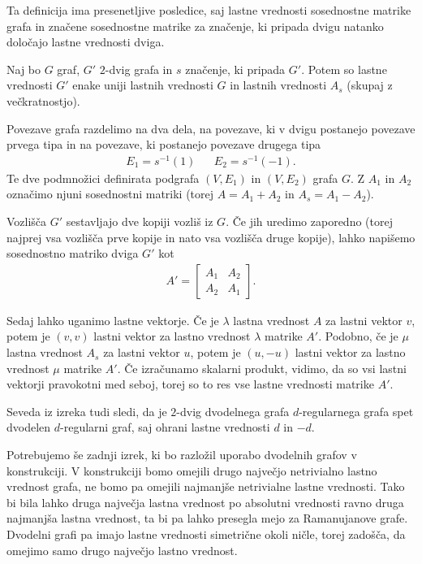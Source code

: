Ta definicija ima presenetljive posledice, saj lastne vrednosti sosednostne matrike grafa in značene sosednostne matrike za značenje, ki pripada dvigu natanko določajo lastne vrednosti dviga\cite{bilu2004constructingexpandergraphs2lifts}.
\begin{izrek}
    Naj bo \(G\) graf, \(G'\) \(2\)-dvig grafa in \(s\) značenje, ki pripada \(G'\). Potem so lastne vrednosti \(G'\) enake uniji lastnih vrednosti \(G\) in lastnih vrednosti \(A_s\) (skupaj z večkratnostjo).
\end{izrek}
\begin{dokaz}
    Povezave grafa razdelimo na dva dela, na povezave, ki v dvigu postanejo povezave prvega tipa in na povezave, ki postanejo povezave drugega tipa
    \begin{align*}
        E_1 = s^{-1}(1) &  & E_2 = s^{-1}(-1).
    \end{align*}
    Te dve podmnožici definirata podgrafa \((V, E_1)\) in \((V, E_2)\) grafa \(G\). Z \(A_1\) in \(A_2\) označimo njuni sosednostni matriki (torej \(A = A_1 + A_2\) in \(A_s = A_1 - A_2\)).

    Vozlišča \(G'\) sestavljajo dve kopiji vozliš iz \(G\). Če jih uredimo zaporedno (torej najprej vsa vozlišča prve kopije in nato vsa vozlišča druge kopije), lahko napišemo sosednostno matriko dviga \(G'\) kot
    \begin{align*}
        A' = \begin{bmatrix}
                 A_1 & A_2 \\
                 A_2 & A_1
             \end{bmatrix}.
    \end{align*}

    Sedaj lahko uganimo lastne vektorje. Če je \(\lambda\) lastna vrednost \(A\) za lastni vektor \(v\), potem je \((v, v)\) lastni vektor za lastno vrednost \(\lambda\) matrike \(A'\). Podobno, če je \(\mu\) lastna vrednost \(A_s\) za lastni vektor \(u\), potem je \((u, -u)\) lastni vektor za lastno vrednost \(\mu\) matrike \(A'\). Če izračunamo skalarni produkt, vidimo, da so vsi lastni vektorji pravokotni med seboj, torej so to res vse lastne vrednosti matrike \(A'\).
\end{dokaz}
Seveda iz izreka tudi sledi, da je \(2\)-dvig dvodelnega grafa \(d\)-regularnega grafa spet dvodelen \(d\)-regularni graf, saj ohrani lastne vrednosti \(d\) in \(-d\).

Potrebujemo še zadnji izrek, ki bo razložil uporabo dvodelnih grafov v konstrukciji. V konstrukciji bomo omejili drugo največjo netrivialno lastno vrednost grafa, ne bomo pa omejili najmanjše netrivialne lastne vrednosti. Tako bi bila lahko druga največja lastna vrednost po absolutni vrednosti ravno druga najmanjša lastna vrednost, ta bi pa lahko presegla mejo za Ramanujanove grafe. Dvodelni grafi pa imajo lastne vrednosti simetrične okoli ničle, torej zadošča, da omejimo samo drugo največjo lastno vrednost\cite{godsil}.

